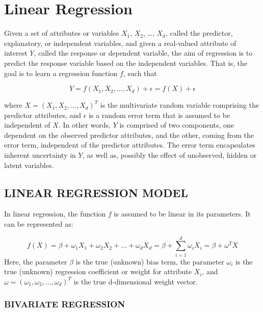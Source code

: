 \documentclass[a4paper,conference]{IEEEtran}
\begin{document}
\hypertarget{sec:linear-regression}{%
\section{Linear Regression}\label{sec:linear-regression}}

Given a set of attributes or variables \(X_1\), \(X_2\), \ldots,
\(X_d\), called the predictor, explanatory, or independent variables,
and given a real-valued attribute of interest \(Y\), called the response
or dependent variable, the aim of regression is to predict the response
variable based on the independent variables. That is, the goal is to
learn a regression function \(f\), such that

\[ Y = f(X_1, X_2, ..., X_d) + \epsilon = f(X) + \epsilon \]

where \(X = (X_1, X_2, ..., X_d)^T\) is the multivariate random variable
comprising the predictor attributes, and \(\epsilon\) is a random error
term that is assumed to be independent of \(X\). In other words, \(Y\)
is comprised of two components, one dependent on the observed predictor
attributes, and the other, coming from the error term, independent of
the predictor attributes. The error term encapsulates inherent
uncertainty in \(Y\), as well as, possibly the effect of unobserved,
hidden or latent variables.

\hypertarget{sec:linear-regression-model}{%
\subsection{LINEAR REGRESSION MODEL}\label{sec:linear-regression-model}}

In linear regression, the function \(f\) is assumed to be linear in its
parameters. It can be represented as:

\[ 
f(X) = \beta + \omega_1 X_1 + \omega_2 X_2 + \ldots + \omega_d X_d = \beta + \sum_{i=1}^{d} \omega_i X_i = \beta + \omega^T X 
\] Here, the parameter \(\beta\) is the true (unknown) bias term, the
parameter \(\omega_i\) is the true (unknown) regression coefficient or
weight for attribute \(X_i\), and
\(\omega = (\omega_1, \omega_2, \ldots, \omega_d)^T\) is the true
d-dimensional weight vector.

\hypertarget{sec:bivariate-regression}{%
\subsubsection{BIVARIATE REGRESSION}\label{sec:bivariate-regression}}
\end{document}
